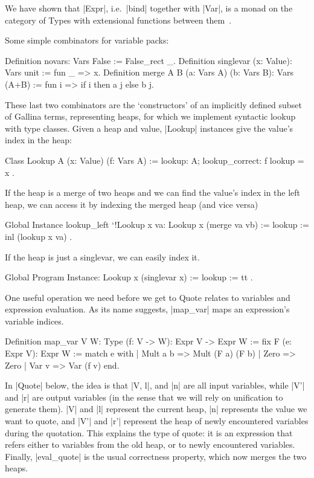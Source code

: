 \documentclass[a4paper,10pt, runningheads]{llncs}
\begin{document}
We have shown that |Expr|, i.e.\ |bind| together with |Var|, is a monad on the category of Types
with extensional functions between them~.

\noindent Some simple combinators for variable packs:
%
\begin{code}
Definition novars: Vars False := False_rect _.
Definition singlevar (x: Value): Vars unit := fun _ => x.
Definition merge {A B} (a: Vars A) (b: Vars B): Vars (A+B) :=
  fun i => if i then a j else b j.
\end{code}

\noindent These last two combinators are the `constructors' of an implicitly defined subset of
 Gallina terms, representing heaps, for which we implement syntactic lookup with type classes.
Given a heap and value, |Lookup| instances give the value's index in the heap:
\begin{code}
  Class Lookup {A} (x: Value) (f: Vars A) :=
    { lookup: A; lookup_correct: f lookup = x }.
\end{code}

If the heap is a merge of two heaps and we can find the value's index in the left heap, we can
access it by indexing the merged heap (and vice versa)
\begin{code}
  Global Instance lookup_left `{!Lookup x va}: Lookup x (merge va vb)
    := { lookup := inl (lookup x va) }.
\end{code}
If the heap is just a singlevar, we can easily index it.
\begin{code}
  Global Program Instance: Lookup x (singlevar x) := { lookup := tt }.
\end{code}

One useful operation we need before we get to Quote relates to variables and expression
 evaluation. As its name suggests, |map_var| maps an expression's variable indices.

\begin{code}
Definition map_var {V W: Type} (f: V -> W):
    Expr V -> Expr W :=
  fix F (e: Expr V): Expr W :=
    match e with
    | Mult a b => Mult (F a) (F b)
    | Zero => Zero
    | Var v => Var (f v)
    end.
\end{code}
In |Quote| below, the idea is that |V, l|, and |n| are all input variables, while |V'| and |r| are
output variables (in the sense that we will rely on unification to generate them). |V| and |l|
represent the current heap, |n| represents the value we want to quote, and |V'| and |r'| represent
the heap of newly encountered variables during the quotation.
  This explains the type of quote: it is an expression that refers either to variables from
the old heap, or to newly encountered variables. Finally, |eval_quote| is the usual correctness
property, which now merges the two heaps.
\end{document}

